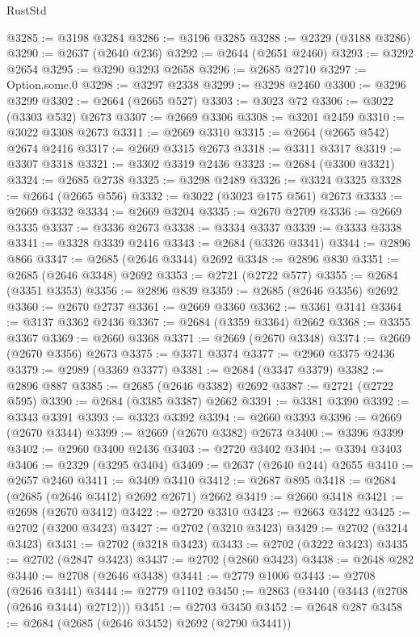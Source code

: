 \begin{lexlean}{RustStd}
\begin{coremodule}
@3285 := @3198 @3284
@3286 := @3196 @3285
@3288 := @2329 (@3188 @3286)
@3290 := @2637 (@2640 @236)
@3292 := @2644 (@2651 @2460)
@3293 := @3292 @2654
@3295 := @3290 @3293 @2658
@3296 := @2685 @2710
@3297 := Option.some.{0}
@3298 := @3297 @2338
@3299 := @3298 @2460
@3300 := @3296 @3299
@3302 := @2664 (@2665 @527)
@3303 := @3023 @72
@3306 := @3022 (@3303 @532) @2673
@3307 := @2669 @3306
@3308 := @3201 @2459
@3310 := @3022 @3308 @2673
@3311 := @2669 @3310
@3315 := @2664 (@2665 @542) @2674 @2416
@3317 := @2669 @3315 @2673
@3318 := @3311 @3317
@3319 := @3307 @3318
@3321 := @3302 @3319 @2436
@3323 := @2684 (@3300 @3321)
@3324 := @2685 @2738
@3325 := @3298 @2489
@3326 := @3324 @3325
@3328 := @2664 (@2665 @556)
@3332 := @3022 (@3023 @175 @561) @2673
@3333 := @2669 @3332
@3334 := @2669 @3204
@3335 := @2670 @2709
@3336 := @2669 @3335
@3337 := @3336 @2673
@3338 := @3334 @3337
@3339 := @3333 @3338
@3341 := @3328 @3339 @2416
@3343 := @2684 (@3326 @3341)
@3344 := @2896 @866
@3347 := @2685 (@2646 @3344) @2692
@3348 := @2896 @830
@3351 := @2685 (@2646 @3348) @2692
@3353 := @2721 (@2722 @577)
@3355 := @2684 (@3351 @3353)
@3356 := @2896 @839
@3359 := @2685 (@2646 @3356) @2692
@3360 := @2670 @2737
@3361 := @2669 @3360
@3362 := @3361 @3141
@3364 := @3137 @3362 @2436
@3367 := @2684 (@3359 @3364) @2662
@3368 := @3355 @3367
@3369 := @2660 @3368
@3371 := @2669 (@2670 @3348)
@3374 := @2669 (@2670 @3356) @2673
@3375 := @3371 @3374
@3377 := @2960 @3375 @2436
@3379 := @2989 (@3369 @3377)
@3381 := @2684 (@3347 @3379)
@3382 := @2896 @887
@3385 := @2685 (@2646 @3382) @2692
@3387 := @2721 (@2722 @595)
@3390 := @2684 (@3385 @3387) @2662
@3391 := @3381 @3390
@3392 := @3343 @3391
@3393 := @3323 @3392
@3394 := @2660 @3393
@3396 := @2669 (@2670 @3344)
@3399 := @2669 (@2670 @3382) @2673
@3400 := @3396 @3399
@3402 := @2960 @3400 @2436
@3403 := @2720 @3402
@3404 := @3394 @3403
@3406 := @2329 (@3295 @3404)
@3409 := @2637 (@2640 @244) @2655
@3410 := @2657 @2460
@3411 := @3409 @3410
@3412 := @2687 @895
@3418 := @2684 (@2685 (@2646 @3412) @2692 @2671) @2662
@3419 := @2660 @3418
@3421 := @2698 (@2670 @3412)
@3422 := @2720 @3310
@3423 := @2663 @3422
@3425 := @2702 (@3200 @3423)
@3427 := @2702 (@3210 @3423)
@3429 := @2702 (@3214 @3423)
@3431 := @2702 (@3218 @3423)
@3433 := @2702 (@3222 @3423)
@3435 := @2702 (@2847 @3423)
@3437 := @2702 (@2860 @3423)
@3438 := @2648 @282
@3440 := @2708 (@2646 @3438)
@3441 := @2779 @1006
@3443 := @2708 (@2646 @3441)
@3444 := @2779 @1102
@3450 := @2863 (@3440 (@3443 (@2708 (@2646 @3444) @2712)))
@3451 := @2703 @3450
@3452 := @2648 @287
@3458 := @2684 (@2685 (@2646 @3452) @2692 (@2790 @3441))

\end{coremodule}
\end{lexlean}
